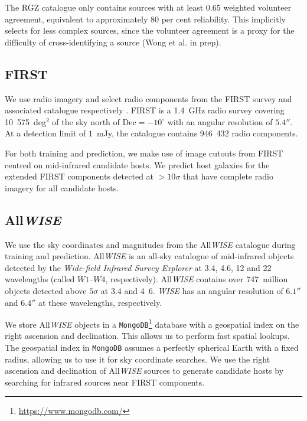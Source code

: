     The RGZ catalogue only contains sources with at least 0.65 weighted volunteer agreement, equivalent to approximately 80 per cent reliability. This implicitly selects for less complex sources, since the volunteer agreement is a proxy for the difficulty of cross-identifying a source (Wong et al. in prep).

    \subsection{FIRST} \label{sec:first-data}

    We use radio imagery and select radio components from the FIRST survey and associated catalogue respectively \citep{white97first,helfand15first}. FIRST is a
    1.4~GHz radio survey covering 10~575~deg$^2$ of the sky north of $\mathrm{Dec} = -10^\circ$ with an angular resolution of $5.4''$. At a detection limit of $1$~mJy, the catalogue contains 946~432 radio components.

    For both training and prediction, we make use of image cutouts from FIRST centred on mid-infrared candidate hosts. We predict host galaxies for the \ncomponents{} extended FIRST components detected at $>10\sigma$ \citep[about 1.5~mJy~beam$^{-1}$, per][]{banfield15} that have complete radio imagery for all candidate hosts.

    \subsection{All\emph{WISE}} \label{sec:wise-data}

    We use the sky coordinates and magnitudes from the All\emph{WISE} \citep{cutri2013wiseexplanatory} catalogue during training and prediction. All\emph{WISE} is an all-sky catalogue of mid-infrared objects detected by the \emph{Wide-field Infrared Survey Explorer} \citep[\emph{WISE}][]{wright10wise} at 3.4, 4.6, 12 and \unit{22}{\micro\meter} wavelengths (called $W1$--$W4$, respectively). All\emph{WISE}
    contains over 747~million objects detected above $5\sigma$ at 3.4 and
    \unit{4.6}{\micro\meter}. \emph{WISE} has an angular resolution of
    $6.1''$ and $6.4''$ at these wavelengths, respectively.

    We store All\emph{WISE} objects in a
    \texttt{MongoDB}\footnote{\url{https://www.mongodb.com/}} database with
    a geospatial index on the right ascension and declination. This allows
    us to perform fast spatial lookups. The geospatial index in
    \texttt{MongoDB} assumes a perfectly spherical Earth with a fixed radius, allowing us to use it for sky coordinate
    searches. We use the right ascension and declination of All\emph{WISE} sources to generate candidate hosts by searching for infrared sources near FIRST components.

